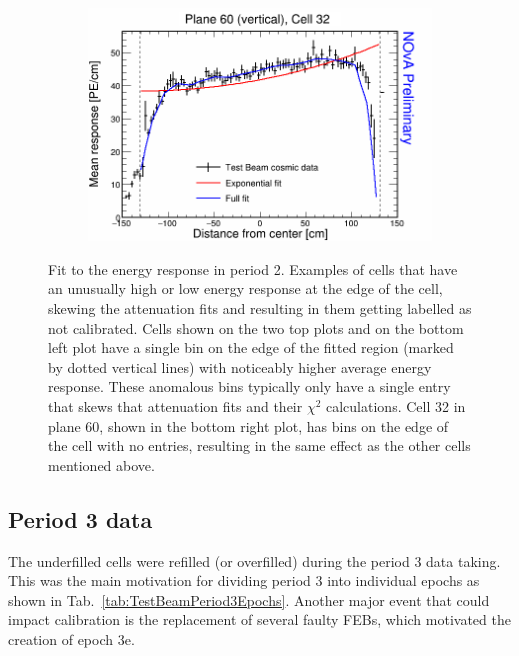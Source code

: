 \begin{figure}[!hbtp]
\begin{subfigure}{0.495\textwidth}
  \end{subfigure}
  \begin{subfigure}{0.495\textwidth}
    \includegraphics[width=\linewidth]{Plots/RelativeCalibrationResults/p2_060_032.png}
  \end{subfigure}
  \caption[Attenuation fits for cells with large fluctuations in period 2 data]{Fit to the energy response in period 2. Examples of cells that have an unusually high or low energy response at the edge of the cell, skewing the attenuation fits and resulting in them getting labelled as not calibrated. Cells shown on the two top plots and on the bottom left plot have a single bin on the edge of the fitted region (marked by dotted vertical lines) with noticeably higher average energy response. These anomalous bins typically only have a single entry that skews that attenuation fits and their $\chi^2$ calculations. Cell 32 in plane 60, shown in the bottom right plot, has bins on the edge of the cell with no entries, resulting in the same effect as the other cells mentioned above.}
  \label{fig:AttenfitResultsPeriod2_CellEdge}
\end{figure}

\subsection{Period 3 data}\label{sec:TBCalibration_period3}
The underfilled cells were refilled (or overfilled) during the period 3 data taking. This was the main motivation for dividing period 3 into individual epochs as shown in Tab.~\ref{tab:TestBeamPeriod3Epochs}. Another major event that could impact calibration is the replacement of several faulty \glspl{FEB}, which motivated the creation of epoch 3e.


